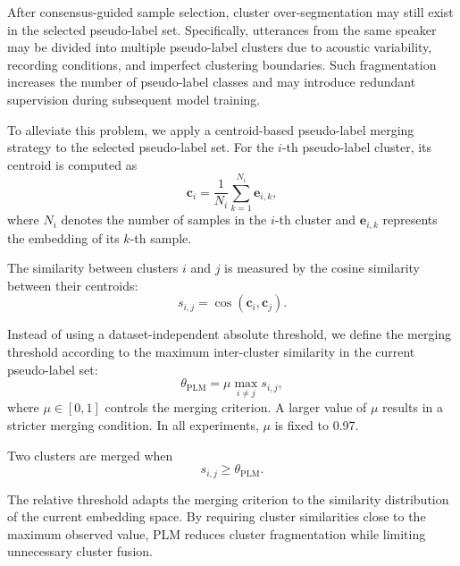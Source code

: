 \documentclass[journal]{IEEEtran}
\begin{document}
After consensus-guided sample selection, cluster over-segmentation may
still exist in the selected pseudo-label set.
Specifically, utterances from the same speaker may be divided into
multiple pseudo-label clusters due to acoustic variability, recording
conditions, and imperfect clustering boundaries.
Such fragmentation increases the number of pseudo-label classes and
may introduce redundant supervision during subsequent model training.

To alleviate this problem, we apply a centroid-based pseudo-label
merging strategy to the selected pseudo-label set.
For the $i$-th pseudo-label cluster, its centroid is computed as
\begin{equation}
\mathbf{c}_i
=
\frac{1}{N_i}
\sum_{k=1}^{N_i}
\mathbf{e}_{i,k},
\end{equation}
where $N_i$ denotes the number of samples in the $i$-th cluster and
$\mathbf{e}_{i,k}$ represents the embedding of its $k$-th sample.

The similarity between clusters $i$ and $j$ is measured by the cosine
similarity between their centroids:
\begin{equation}
s_{i,j}
=
\cos(\mathbf{c}_i,\mathbf{c}_j).
\end{equation}

Instead of using a dataset-independent absolute threshold, we define
the merging threshold according to the maximum inter-cluster similarity
in the current pseudo-label set:
\begin{equation}
\theta_{\mathrm{PLM}}
=
\mu
\max_{i\neq j}
s_{i,j},
\end{equation}
where $\mu\in[0,1]$ controls the merging criterion.
A larger value of $\mu$ results in a stricter merging condition.
In all experiments, $\mu$ is fixed to 0.97.

Two clusters are merged when
\begin{equation}
s_{i,j}
\geq
\theta_{\mathrm{PLM}}.
\end{equation}

The relative threshold adapts the merging criterion to the similarity
distribution of the current embedding space.
By requiring cluster similarities close to the maximum observed value,
PLM reduces cluster fragmentation while limiting unnecessary cluster
fusion.
\end{document}
